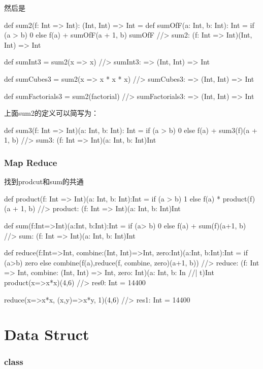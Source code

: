 然后是
\begin{Scala}
  def sum2(f: Int => Int): (Int, Int) => Int = {
    def sumOfF(a: Int, b: Int): Int =
      if (a > b) 0 else f(a) + sumOfF(a + 1, b)
    sumOfF
  }                                               //> sum2: (f: Int => Int)(Int, Int) => Int

  def sumInt3 = sum2(x => x)                      //> sumInt3: => (Int, Int) => Int

  def sumCubes3 = sum2(x => x * x * x)            //> sumCubes3: => (Int, Int) => Int

  def sumFactorials3 = sum2(factorial)            //> sumFactorials3: => (Int, Int) => Int	
\end{Scala}

上面sum2的定义可以简写为：
\begin{Scala}
  def sum3(f: Int => Int)(a: Int, b: Int): Int =
    if (a > b) 0 else f(a) + sum3(f)(a + 1, b)    //> sum3: (f: Int => Int)(a: Int, b: Int)Int
\end{Scala}

\subsubsection{Map Reduce}
找到prodcut和sum的共通
\begin{Scala}
  def product(f: Int => Int)(a: Int, b: Int):Int =
    if (a > b) 1 else f(a) * product(f)(a + 1, b) //> product: (f: Int => Int)(a: Int, b: Int)Int
    
  def sum(f:Int=>Int)(a:Int, b:Int):Int =
  	if (a> b) 0 else f(a) + sum(f)(a+1, b)    //> sum: (f: Int => Int)(a: Int, b: Int)Int
 
 def reduce(f:Int=>Int, combine:(Int, Int)=>Int, zero:Int)(a:Int, b:Int):Int =
 	if (a>b) zero
 	else combine(f(a),reduce(f, combine, zero)(a+1, b))
                                                  //> reduce: (f: Int => Int, combine: (Int, Int) => Int, zero: Int)(a: Int, b: In
                                                  //| t)Int
  product(x=>x*x)(4,6)                            //> res0: Int = 14400
  
  reduce(x=>x*x, (x,y)=>x*y, 1)(4,6)              //> res1: Int = 14400
\end{Scala}


\section{Data Struct}

\subsubsection{class}
